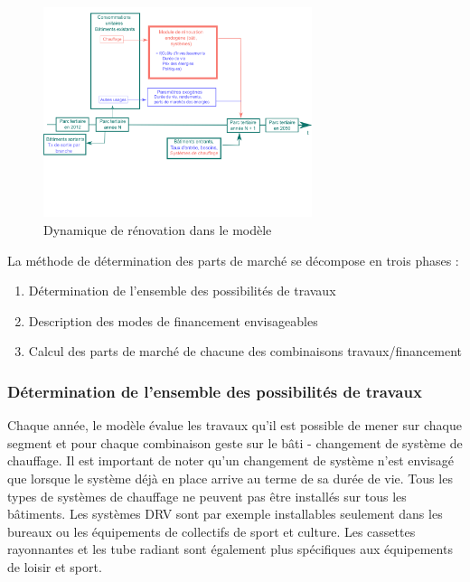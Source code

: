 \documentclass[10.5pt,a4paper]{article}
\begin{document}
{\begin{figure}[h!]
\centering
\caption{Dynamique de rénovation dans le modèle }\label{schema_renov}

\includegraphics[width = 0.7\textwidth]{schema_renov}  

\end{figure}


La méthode de détermination des parts de marché se décompose en trois phases :

\begin{enumerate}
	\item Détermination de l’ensemble des possibilités de travaux
	\item Description des modes de financement envisageables
	\item Calcul des parts de marché de chacune des combinaisons travaux/financement
\end{enumerate}

\subsubsection{Détermination de l’ensemble des possibilités de travaux}

Chaque année, le modèle évalue les travaux qu'il est possible de mener sur chaque segment et pour chaque combinaison geste sur le bâti - changement de système de chauffage. Il est important de noter qu’un changement de système n’est envisagé que lorsque le système déjà en place arrive au terme de sa durée de vie. Tous les types de systèmes de chauffage ne peuvent pas être installés sur tous les bâtiments. Les systèmes DRV sont par exemple installables seulement dans les bureaux ou les équipements de collectifs de sport et culture. Les cassettes rayonnantes et les tube radiant sont également plus spécifiques aux équipements de loisir et sport.  


}
\end{document}
